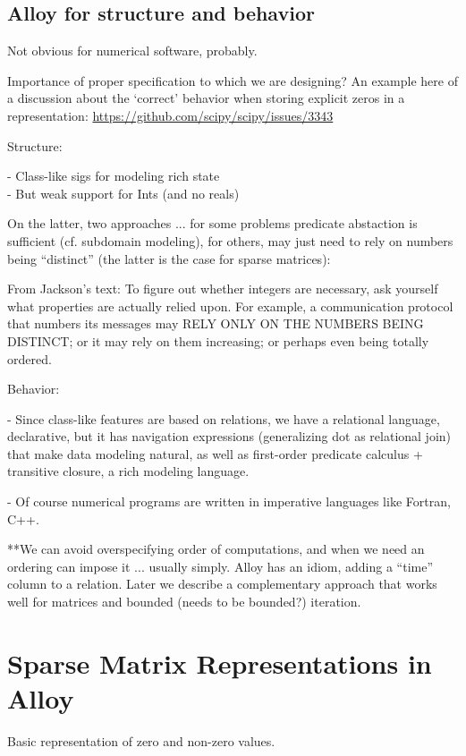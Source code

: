 \documentclass{article}
\begin{document}
\subsection*{Alloy for structure and behavior}

Not obvious for numerical software, probably.

\cbstart
Importance of proper specification to which we are designing? An example here of a discussion about the `correct' behavior when storing explicit zeros in a representation: \url{https://github.com/scipy/scipy/issues/3343}
\cbend

Structure:

- Class-like sigs for modeling rich state\\
- But weak support for Ints (and no reals)

On the latter, two approaches ... for some problems predicate
abstaction is sufficient (cf. subdomain modeling), for others, may
just need to rely on numbers being ``distinct'' (the latter is the
case for sparse matrices):

From Jackson's text: To figure out whether integers are necessary, ask
yourself what properties are actually relied upon. For example, a
communication protocol that numbers its messages may RELY ONLY ON THE
NUMBERS BEING DISTINCT; or it may rely on them increasing; or perhaps
even being totally ordered.

Behavior:

- Since class-like features are based on relations, we have a
relational language, declarative, but it has navigation expressions
(generalizing dot as relational join) that make data modeling natural,
as well as first-order predicate calculus + transitive closure, a rich
modeling language.

- Of course numerical programs are written in imperative languages
like Fortran, C++.

**We can avoid overspecifying order of computations, and when we need
an ordering can impose it ... usually simply.  Alloy has an idiom,
adding a ``time'' column to a relation.  Later we describe a
complementary approach that works well for matrices and bounded (needs
to be bounded?) iteration.

\section{Sparse Matrix Representations in Alloy}

Basic representation of zero and non-zero values.
\end{document}
